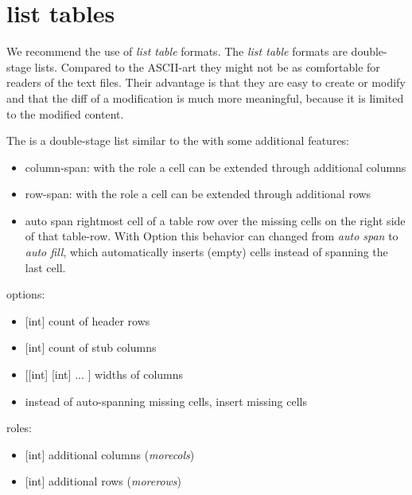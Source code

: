\documentclass[a4paper,8pt,english]{sphinxmanual}
\begin{document}
\section{list tables}
\label{doc-guide/sphinx:list-tables}
We recommend the use of \emph{list table} formats. The \emph{list table} formats are
double-stage lists. Compared to the ASCII-art they might not be as
comfortable for
readers of the text files. Their advantage is that they are easy to
create or modify and that the diff of a modification is much more meaningful,
because it is limited to the modified content.

The  is a double-stage list similar to the  with
some additional features:
\begin{itemize}
\item {} 
column-span: with the role  a cell can be extended through
additional columns

\item {} 
row-span: with the role  a cell can be extended through
additional rows

\item {} 
auto span rightmost cell of a table row over the missing cells on the right
side of that table-row.  With Option  this behavior can
changed from \emph{auto span} to \emph{auto fill}, which automatically inserts (empty)
cells instead of spanning the last cell.

\end{itemize}

options:
\begin{itemize}
\item {} 
   {[}int{]} count of header rows

\item {} 
  {[}int{]} count of stub columns

\item {} 
        {[}{[}int{]} {[}int{]} ... {]} widths of columns

\item {} 
    instead of auto-spanning missing cells, insert missing cells

\end{itemize}

roles:
\begin{itemize}
\item {} 
 {[}int{]} additional columns (\emph{morecols})

\item {} 
 {[}int{]} additional rows (\emph{morerows})

\end{itemize}
\end{document}
